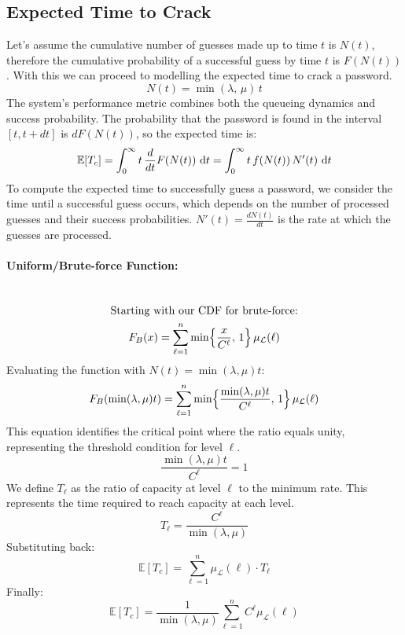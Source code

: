 \subsection{Expected Time to Crack}
\label{how-passwords::time-to-crack}
Let's assume the cumulative number of guesses made up to time $t$ is $N(t)$, therefore the cumulative probability of a successful guess by time $t$ is $F(N(t))$.  With this we can proceed to modelling the expected time to crack a password.
\begin{equation}
N(t) = \min(\lambda,\,\mu)\,t
\end{equation}
The system's performance metric combines both the queueing dynamics and success probability. The probability that the password is found in the interval $[t, t + dt]$ is $dF(N(t))$, so the expected time is:
\begin{equation}
\mathbb{E}[T_c] = \int_0^\infty t\,\frac{d}{dt}F(N(t))\,\operatorname*{\mathrm{d}\!} t = \int_0^\infty t\,f(N(t))\,N'(t)\,\operatorname*{\mathrm{d}\!} t
\end{equation}
To compute the expected time to successfully guess a password, we consider the time until a successful guess occurs, which depends on the number of processed guesses and their success probabilities. $N'(t) = \frac{dN(t)}{dt}$ is the rate at which the guesses are processed.

\paragraph{Uniform/Brute-force Function:}

\begin{multline*}
\\
\text{Starting with our CDF for brute-force:} \\
F_B(x) = \sum_{\ell=1}^n \min \Bigl\{ \frac{x}{C^\ell},\,1 \Bigr\} \, \mu_{\mathcal{L}}(\ell) \\
\end{multline*}
Evaluating the function with $N(t) = \min(\lambda, \mu)t$:
\begin{equation}
F_B(\min(\lambda, \mu)t) = \sum_{\ell=1}^n \min \Bigl\{ \frac{\min(\lambda, \mu)t}{C^\ell},\,1 \Bigr\} \, \mu_{\mathcal{L}}(\ell)
\end{equation}
This equation identifies the critical point where the ratio equals unity, representing the threshold condition for level $\ell$.
\begin{equation}
\frac{\min(\lambda, \mu)t}{C^\ell} = 1
\end{equation}
We define $T_\ell$ as the ratio of capacity at level $\ell$ to the minimum rate. This represents the time required to reach capacity at each level.
\begin{equation}
T_\ell = \frac{C^\ell}{\min(\lambda, \mu)}
\end{equation}
Substituting back:
\begin{equation}
\mathbb{E}[T_c] = \sum_{\ell=1}^n \mu_{\mathcal{L}}(\ell) \cdot T_\ell
\end{equation}
Finally:
\begin{equation}
\mathbb{E}[T_c] = \frac{1}{\min(\lambda, \mu)} \sum_{\ell=1}^n C^\ell \mu_{\mathcal{L}}(\ell)
\end{equation}

